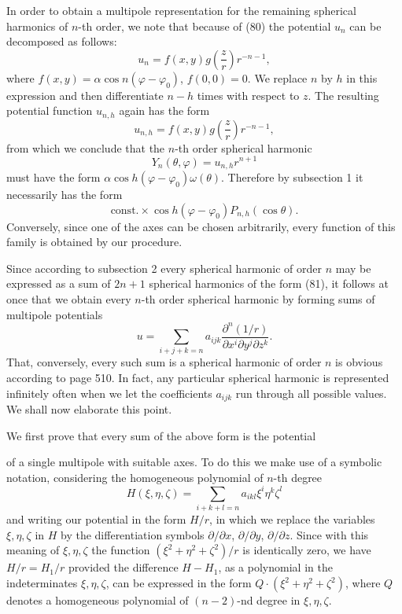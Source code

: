 In order to obtain a multipole representation for the remaining spherical harmonics of $n$-th order, we note that because of (80) the potential $u_n$ can be decomposed as follows:
\[
u_n=f(x,y)g\left(\frac zr\right)r^{-n-1},
\]
where $f(x,y)=\alpha\cos n(\varphi-\varphi_0)$, $f(0,0)=0$. We replace $n$ by $h$ in this expression and then differentiate $n-h$ times with respect to $z$. The resulting potential function $u_{n,h}$ again has the form
\[
u_{n,h}=f(x,y)g\left(\frac zr\right)r^{-n-1},
\]
from which we conclude that the $n$-th order spherical harmonic
\[
Y_n(\theta,\varphi)=u_{n,h}r^{n+1}
\]
must have the form $\alpha\cos h(\varphi-\varphi_0)\omega(\theta)$. Therefore by subsection 1 it necessarily has the form
\begin{equation}\tag{81}
\text{const.}\times\cos h(\varphi-\varphi_0)P_{n,h}(\cos\theta).
\end{equation}
Conversely, since one of the axes can be chosen arbitrarily, every function of this family is obtained by our procedure.

Since according to subsection 2 every spherical harmonic of order $n$ may be expressed as a sum of $2n+1$ spherical harmonics of the form (81), it follows at once that we obtain every $n$-th order spherical harmonic by forming sums of multipole potentials
\begin{equation}\tag{82}
u=\sum_{i+j+k=n}a_{ijk}
\frac{\partial^n(1/r)}{\partial x^i\partial y^j\partial z^k}.
\end{equation}
That, conversely, every such sum is a spherical harmonic of order $n$ is obvious according to page 510. In fact, any particular spherical harmonic is represented infinitely often when we let the coefficients $a_{ijk}$ run through all possible values. We shall now elaborate this point.

We first prove that every sum of the above form is the potential

of a single multipole with suitable axes. To do this we make use of a symbolic notation, considering the homogeneous polynomial of $n$-th degree
\[
H(\xi,\eta,\zeta)=\sum_{i+k+l=n}a_{ikl}\xi^i\eta^k\zeta^l
\]
and writing our potential in the form $H/r$, in which we replace the variables $\xi,\eta,\zeta$ in $H$ by the differentiation symbols $\partial/\partial x$, $\partial/\partial y$, $\partial/\partial z$. Since with this meaning of $\xi,\eta,\zeta$ the function $(\xi^2+\eta^2+\zeta^2)/r$ is identically zero, we have $H/r=H_1/r$ provided the difference $H-H_1$, as a polynomial in the indeterminates $\xi,\eta,\zeta$, can be expressed in the form $Q\cdot(\xi^2+\eta^2+\zeta^2)$, where $Q$ denotes a homogeneous polynomial of $(n-2)$-nd degree in $\xi,\eta,\zeta$.

